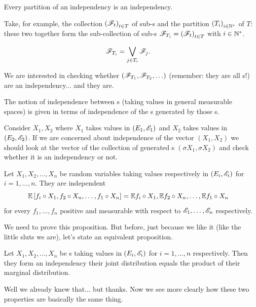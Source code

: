 \documentclass{report}
\begin{document}
\begin{proposition}
	Every partition of an independency is an independency.
\end{proposition}
Take, for example, the collection 
${(\mathscr{F}_t)}_{t\in T}$ of sub-\sa s and the partition ${(T_i)}_{i\in\mathbb{N}^*}$
 of $T$: these two together form the sub-collection of sub-\sa s $\mathscr{F}_{T_i}={(\mathscr{F}_t)}_{t\in T}$
  with $i\in\mathbb{N}^{*}$.
\begin{notation}
	\[\mathscr{F}_{T_i}=\bigvee_{j\in T_i}\mathscr{F}_j.\]
\end{notation}
We are interested in checking whether $(\mathscr{F}_{T_1},\mathscr{F}_{T_2},\ldots)$ (remember: they are all \sa s!) are an independency... and they are.
\begin{proposition}
The notion of independence between \rv s (taking values in general measurable spaces) is given in terms of independence of the \sa s generated by those \rv s.
\end{proposition}
\begin{example}
	Consider
	$X_1,X_2$ where $X_1$ takes values in $(E_1,\mathscr{E}_1)$ and $X_2$ takes values in $(E_2,\mathscr{E}_2)$. If we are concerned about independence of the vector $(X_1,X_2)$ we should look at the vector of the collection of generated \sa s $(\sigma X_1,\sigma X_2)$ and check whether it is an independency or not.
\end{example}
\begin{proposition}	Let $X_1,X_2,\ldots,X_n$ be random variables taking values respectively in $(E_i,\mathscr{E}_i)$ for $i=1,\ldots,n$. They are independent \ifonly{} 
	\[\mathbb{E}\left[f_i\circ X_1,f_2\circ X_n,\ldots,f_1\circ X_n\right]=\mathbb{E} f_i\circ X_1,\mathbb{E} f_2\circ X_n,\ldots,\mathbb{E} f_1\circ X_n\]
	for every $f_1,\ldots,f_n$ positive and measurable with respect to $\mathscr{E}_1,\ldots,\mathscr{E}_n$ respectively.
\end{proposition}
We need to prove this proposition. But before, just because we like it (like the little sluts we are), let's state an equivalent proposition. 
\begin{proposition}
Let $X_1,X_2,\ldots,X_n$ be \rv s taking values in $(E_i,\mathscr{E}_i)$ for $i=1,\ldots,n$ respectively. Then they form an independency \ifonly{} their joint distribution equals the product of their marginal distribution.
\end{proposition}
Well we already knew that... but thanks. Now we see more clearly how these two properties are basically the same thing.
\end{document}
